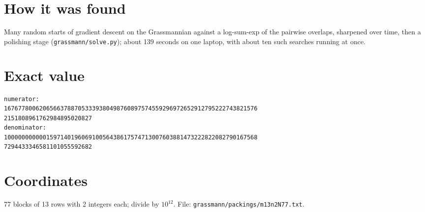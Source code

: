 \documentclass[11pt,a4paper]{article}
\begin{document}
\section{How it was found}
Many random starts of gradient descent on the Grassmannian against a log-sum-exp of the pairwise overlaps, sharpened over time, then a polishing stage (\texttt{grassmann/solve.py}); about 139 seconds on one laptop, with about ten such searches running at once.


\appendix
\section{Exact value}
{\small
\begin{verbatim}
numerator:
167677800620656637887053339380498760897574559296972652912795222743821576
2151808961762984895020827
denominator:
100000000000159714019606910056438617574713007603881473222822082790167568
7294433346581101055592682
\end{verbatim}}

\section{Coordinates}
77 blocks of 13 rows with 2 integers each; divide by $10^{12}$. File: \texttt{grassmann/packings/m13n2N77.txt}.
{\tiny
\begin{multicols}{4}
\end{multicols}}
\end{document}

